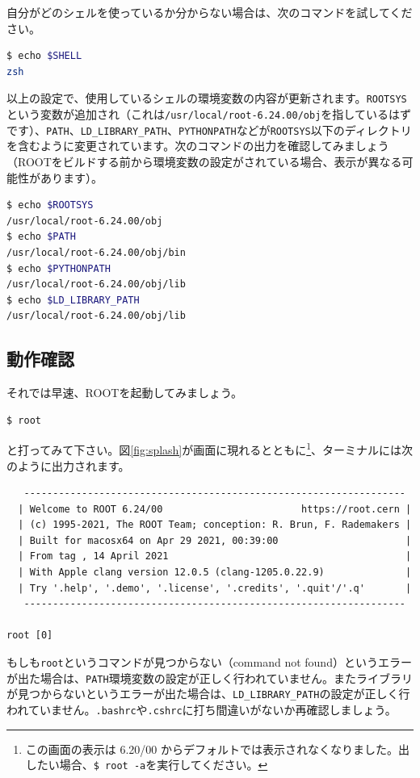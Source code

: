{自分がどのシェルを使っているか分からない場合は、次のコマンドを試してください。
\begin{lstlisting}[language=bash]
$ echo $SHELL
zsh
\end{lstlisting}

以上の設定で、使用しているシェルの環境変数の内容が更新されます。\texttt{ROOTSYS}という変数が追加され（これは\texttt{/usr/local/root-6.24.00/obj}を指しているはずです）、\texttt{PATH}、\texttt{LD\_LIBRARY\_PATH}、\texttt{PYTHONPATH}などが\texttt{ROOTSYS}以下のディレクトリを含むように変更されています。次のコマンドの出力を確認してみましょう（ROOTをビルドする前から環境変数の設定がされている場合、表示が異なる可能性があります）。
\begin{lstlisting}[language=bash]
$ echo $ROOTSYS
/usr/local/root-6.24.00/obj
$ echo $PATH
/usr/local/root-6.24.00/obj/bin
$ echo $PYTHONPATH
/usr/local/root-6.24.00/obj/lib
$ echo $LD_LIBRARY_PATH
/usr/local/root-6.24.00/obj/lib
\end{lstlisting}

\subsection{動作確認}

それでは早速、ROOTを起動してみましょう。
\begin{lstlisting}[language=bash]
$ root
\end{lstlisting}
と打ってみて下さい。図\ref{fig:splash}が画面に現れるとともに\footnote{この画面の表示は 6.20/00 からデフォルトでは表示されなくなりました。出したい場合、\texttt{\$ root -a}を実行してください。}、ターミナルには次のように出力されます。
\begin{lstlisting}
   ------------------------------------------------------------------
  | Welcome to ROOT 6.24/00                        https://root.cern |
  | (c) 1995-2021, The ROOT Team; conception: R. Brun, F. Rademakers |
  | Built for macosx64 on Apr 29 2021, 00:39:00                      |
  | From tag , 14 April 2021                                         |
  | With Apple clang version 12.0.5 (clang-1205.0.22.9)              |
  | Try '.help', '.demo', '.license', '.credits', '.quit'/'.q'       |
   ------------------------------------------------------------------

root [0] 
\end{lstlisting}
もしも\texttt{root}というコマンドが見つからない（command not found）というエラーが出た場合は、\texttt{PATH}環境変数の設定が正しく行われていません。またライブラリが見つからないというエラーが出た場合は、\texttt{LD\_LIBRARY\_PATH}の設定が正しく行われていません。\texttt{.bashrc}や\texttt{.cshrc}に打ち間違いがないか再確認しましょう。

}
